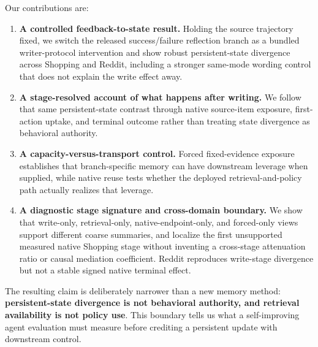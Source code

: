 Our contributions are:
\begin{enumerate}
    \item \textbf{A controlled feedback-to-state result.} Holding the source trajectory fixed, we switch the released success/failure reflection branch as a bundled writer-protocol intervention and show robust persistent-state divergence across Shopping and Reddit, including a stronger same-mode wording control that does not explain the write effect away.
    \item \textbf{A stage-resolved account of what happens after writing.} We follow that same persistent-state contrast through native source-item exposure, first-action uptake, and terminal outcome rather than treating state divergence as behavioral authority.
    \item \textbf{A capacity-versus-transport control.} Forced fixed-evidence exposure establishes that branch-specific memory can have downstream leverage when supplied, while native reuse tests whether the deployed retrieval-and-policy path actually realizes that leverage.
    \item \textbf{A diagnostic stage signature and cross-domain boundary.} We show that write-only, retrieval-only, native-endpoint-only, and forced-only views support different coarse summaries, and localize the first unsupported measured native Shopping stage without inventing a cross-stage attenuation ratio or causal mediation coefficient. Reddit reproduces write-stage divergence but not a stable signed native terminal effect.
\end{enumerate}

The resulting claim is deliberately narrower than a new memory method: \textbf{persistent-state divergence is not behavioral authority, and retrieval availability is not policy use}. This boundary tells us what a self-improving agent evaluation must measure before crediting a persistent update with downstream control.
